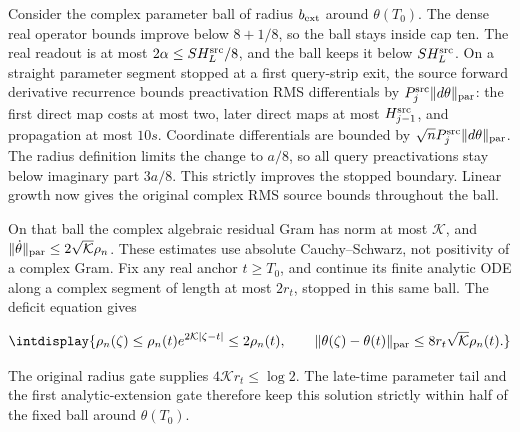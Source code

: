 
Consider the complex parameter ball of radius \(b_{\rm ext}\) around \(\theta(T_0)\). The dense real operator bounds improve below \(8+1/8\), so the ball stays inside cap ten. The real readout is at most \(2\alpha\le SH_L^{\rm src}/8\), and the ball keeps it below \(SH_L^{\rm src}\). On a straight parameter segment stopped at a first query-strip exit, the source forward derivative recurrence bounds preactivation RMS differentials by \(P_j^{\rm src}\|d\theta\|_{\rm par}\): the first direct map costs at most two, later direct maps at most \(H_{j-1}^{\rm src}\), and propagation at most \(10s\). Coordinate differentials are bounded by \(\sqrt nP_j^{\rm src}\|d\theta\|_{\rm par}\). The radius definition limits the change to \(a/8\), so all query preactivations stay below imaginary part \(3a/8\). This strictly improves the stopped boundary. Linear growth now gives the original complex RMS source bounds throughout the ball.



On that ball the complex algebraic residual Gram has norm at most \(\mathcal K\), and \(\|\dot\theta\|_{\rm par}\le2\sqrt{\mathcal K}\rho_n\). These estimates use absolute Cauchy--Schwarz, not positivity of a complex Gram. Fix any real anchor \(t\ge T_0\), and continue its finite analytic ODE along a complex segment of length at most \(2r_t\), stopped in this same ball. The deficit equation gives


\begingroup\renewcommand{\theHequation}{intdisplay.629}
\begin{equation*}
\intdisplay{
\rho_n(\zeta)\le\rho_n(t)e^{2\mathcal K|\zeta-t|}
                     \le2\rho_n(t),\qquad
\|\theta(\zeta)-\theta(t)\|_{\rm par}
                     \le8r_t\sqrt{\mathcal K}\rho_n(t).
}
\end{equation*}
\endgroup


The original radius gate supplies \(4\mathcal Kr_t\le\log2\). The late-time parameter tail and the first analytic-extension gate therefore keep this solution strictly within half of the fixed ball around \(\theta(T_0)\).



